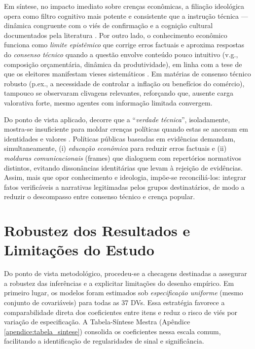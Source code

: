 Em síntese, no impacto imediato sobre crenças econômicas, a filiação ideológica opera como filtro cognitivo mais potente e consistente que a instrução técnica --- dinâmica congruente com o viés de confirmação e a cognição cultural documentados pela literatura \cite{kahneman2011thinking, kahan2012polarization}. Por outro lado, o conhecimento econômico funciona como \textit{limite epistêmico} que corrige erros factuais e aproxima respostas do \textit{consenso técnico} quando a questão envolve conteúdo pouco intuitivo (v.g., composição orçamentária, dinâmica da produtividade), em linha com a tese de que os eleitores manifestam vieses sistemáticos \cite{The_Myth_of_the_Rational_Voter}. Em matérias de consenso técnico robusto (p.ex., a necessidade de controlar a inflação ou benefícios do comércio), tampouco se observaram clivagens relevantes, reforçando que, ausente carga valorativa forte, mesmo agentes com informação limitada convergem.

Do ponto de vista aplicado, decorre que a ``\textit{verdade técnica}'', isoladamente, mostra-se insuficiente para moldar crenças políticas quando estas se ancoram em identidades e valores \cite{westen2007political}. Políticas públicas baseadas em evidências demandam, simultaneamente, (i) \textit{educação econômica} para reduzir erros factuais e (ii) \textit{molduras comunicacionais} (frames) que dialoguem com repertórios normativos distintos, evitando dissonâncias identitárias que levam à rejeição de evidências. Assim, mais que opor conhecimento e ideologia, impõe-se reconciliá-los: integrar fatos verificáveis a narrativas legitimadas pelos grupos destinatários, de modo a reduzir o descompasso entre consenso técnico e crença popular.

\section{Robustez dos Resultados e Limitações do Estudo}
Do ponto de vista metodológico, procedeu-se a checagens destinadas a assegurar a robustez das inferências e a explicitar limitações do desenho empírico. Em primeiro lugar, os modelos foram estimados sob \textit{especificação uniforme} (mesmo conjunto de covariáveis) para todas as 37 DVs. Essa estratégia favorece a comparabilidade direta dos coeficientes entre itens e reduz o risco de viés por variação de especificação. A Tabela-Síntese Mestra (Apêndice \autoref{apendice:tabela_sintese}) consolida os coeficientes nessa escala comum, facilitando a identificação de regularidades de sinal e significância.

